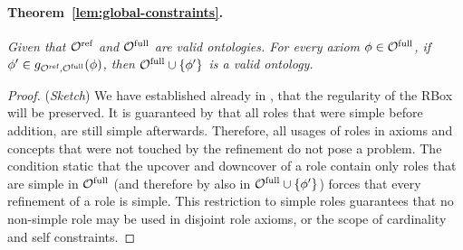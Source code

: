 \documentclass[
]{ceurart}
\newtheorem{theorem}{Theorem}
\begin{document}
\paragraph{Theorem~\ref{lem:global-constraints}.}
{\it
Given that ${\mathcal{O}^\textnormal{ref}}$ and ${\mathcal{O}^\textnormal{full}}$ are valid \SROIQ ontologies. For every axiom $\phi \in {\mathcal{O}^\textnormal{full}}$, if $\phi' \in g_{{\mathcal{O}^\textnormal{ref}},{\mathcal{O}^\textnormal{full}}}(\phi)$, then ${\mathcal{O}^\textnormal{full}} \cup \{ \phi' \}$ is a valid \SROIQ ontology.
}

\begin{proof}(\emph{Sketch})
  We have established already in , that the regularity of the RBox will be preserved.
  It is guaranteed by  that all roles that were simple before addition, are still simple afterwards. Therefore, all usages of roles in axioms and concepts that were not touched by the refinement do not pose a problem. The condition static that the upcover and downcover of a role contain only roles that are simple in ${\mathcal{O}^\textnormal{full}}$ (and therefore by  also in ${\mathcal{O}^\textnormal{full}} \cup \{ \phi' \}$) forces that every refinement of a role is simple. This restriction to simple roles guarantees that no non-simple role may be used in disjoint role axioms, or the scope of cardinality and self constraints.
\end{proof}
\end{document}
